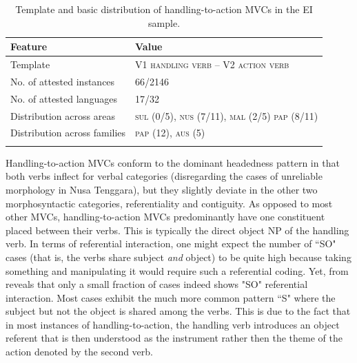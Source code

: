 \begin{table}
\begin{tabular}{ll}
\lsptoprule
Feature&Value\tabularnewline
\midrule
Template&V1 \textsc{handling verb} -- V2 \textsc{action verb}\tabularnewline
No. of attested instances& 66/2146 \tabularnewline
No. of attested languages& 17/32 \tabularnewline
Distribution across areas& \textsc{sul} (0/5), \textsc{nus} (7/11), \textsc{mal} (2/5) \textsc{pap} (8/11) \tabularnewline
Distribution across families& \textsc{pap} (12), \textsc{aus} (5) \tabularnewline
\lspbottomrule
\end{tabular}
\caption[Template and basic distribution of handling-to-action MVCs]{Template and basic distribution of handling-to-action MVCs in the EI sample.}
\label{table:handling-to-action}
\end{table}

Handling-to-action MVCs conform to the dominant headedness pattern in that both verbs inflect for verbal categories (disregarding the cases of unreliable morphology in Nusa Tenggara), but they slightly deviate in the other two morphosyntactic categories, referentiality and contiguity. As opposed to most other MVCs, handling-to-action MVCs predominantly have one constituent placed between their verbs. This is typically the direct object NP of the handling verb. In terms of referential interaction, one might expect the number of ``SO" cases (that is, the verbs share subject \emph{and} object) to be quite high because taking something and manipulating it would require such a referential coding. Yet,  from  reveals that only a small fraction of cases indeed shows "SO" referential interaction. Most cases exhibit the much more common pattern ``S" where the subject but not the object is shared among the verbs. This is due to the fact that in most instances of handling-to-action, the handling verb introduces an object referent that is then understood as the instrument rather then the theme of the action denoted by the second verb. 

